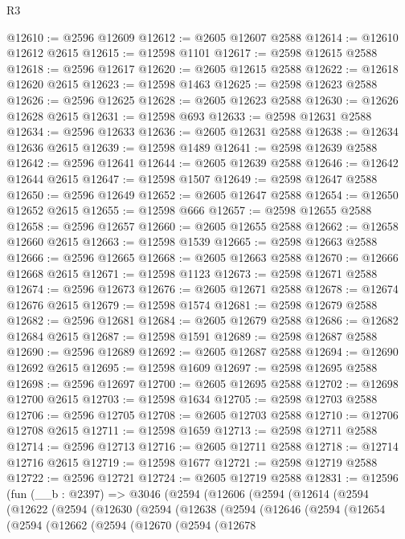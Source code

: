 \begin{lexlean}{R3}
\begin{coremodule}
@12610 := @2596 @12609
@12612 := @2605 @12607 @2588
@12614 := @12610 @12612 @2615
@12615 := @12598 @1101
@12617 := @2598 @12615 @2588
@12618 := @2596 @12617
@12620 := @2605 @12615 @2588
@12622 := @12618 @12620 @2615
@12623 := @12598 @1463
@12625 := @2598 @12623 @2588
@12626 := @2596 @12625
@12628 := @2605 @12623 @2588
@12630 := @12626 @12628 @2615
@12631 := @12598 @693
@12633 := @2598 @12631 @2588
@12634 := @2596 @12633
@12636 := @2605 @12631 @2588
@12638 := @12634 @12636 @2615
@12639 := @12598 @1489
@12641 := @2598 @12639 @2588
@12642 := @2596 @12641
@12644 := @2605 @12639 @2588
@12646 := @12642 @12644 @2615
@12647 := @12598 @1507
@12649 := @2598 @12647 @2588
@12650 := @2596 @12649
@12652 := @2605 @12647 @2588
@12654 := @12650 @12652 @2615
@12655 := @12598 @666
@12657 := @2598 @12655 @2588
@12658 := @2596 @12657
@12660 := @2605 @12655 @2588
@12662 := @12658 @12660 @2615
@12663 := @12598 @1539
@12665 := @2598 @12663 @2588
@12666 := @2596 @12665
@12668 := @2605 @12663 @2588
@12670 := @12666 @12668 @2615
@12671 := @12598 @1123
@12673 := @2598 @12671 @2588
@12674 := @2596 @12673
@12676 := @2605 @12671 @2588
@12678 := @12674 @12676 @2615
@12679 := @12598 @1574
@12681 := @2598 @12679 @2588
@12682 := @2596 @12681
@12684 := @2605 @12679 @2588
@12686 := @12682 @12684 @2615
@12687 := @12598 @1591
@12689 := @2598 @12687 @2588
@12690 := @2596 @12689
@12692 := @2605 @12687 @2588
@12694 := @12690 @12692 @2615
@12695 := @12598 @1609
@12697 := @2598 @12695 @2588
@12698 := @2596 @12697
@12700 := @2605 @12695 @2588
@12702 := @12698 @12700 @2615
@12703 := @12598 @1634
@12705 := @2598 @12703 @2588
@12706 := @2596 @12705
@12708 := @2605 @12703 @2588
@12710 := @12706 @12708 @2615
@12711 := @12598 @1659
@12713 := @2598 @12711 @2588
@12714 := @2596 @12713
@12716 := @2605 @12711 @2588
@12718 := @12714 @12716 @2615
@12719 := @12598 @1677
@12721 := @2598 @12719 @2588
@12722 := @2596 @12721
@12724 := @2605 @12719 @2588
@12831 := @12596
    (fun (__b : @2397) =>
    @3046
      (@2594
        (@12606
          (@2594
            (@12614
              (@2594
                (@12622
                  (@2594
                    (@12630
                      (@2594
                        (@12638
                          (@2594
                            (@12646
                              (@2594
                                (@12654
                                  (@2594
                                    (@12662
                                      (@2594
                                        (@12670
                                          (@2594
                                            (@12678

\end{coremodule}
\end{lexlean}
